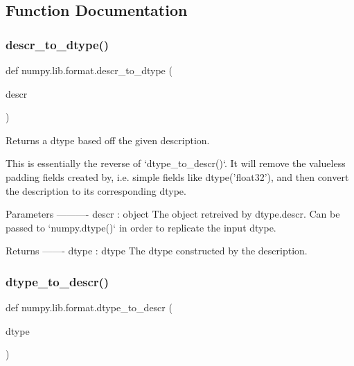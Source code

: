 \subsection{Function Documentation}
\mbox{\label{namespacenumpy_1_1lib_1_1format_a8ef944b60e69a059642419df5bc12fb0}} 
\subsubsection{\texorpdfstring{descr\+\_\+to\+\_\+dtype()}{descr\_to\_dtype()}}
{\footnotesize\ttfamily def numpy.\+lib.\+format.\+descr\+\_\+to\+\_\+dtype (\begin{DoxyParamCaption}\item[{}]{descr }\end{DoxyParamCaption})}

\begin{DoxyVerb}Returns a dtype based off the given description.

This is essentially the reverse of `dtype_to_descr()`. It will remove
the valueless padding fields created by, i.e. simple fields like
dtype('float32'), and then convert the description to its corresponding
dtype.

Parameters
----------
descr : object
    The object retreived by dtype.descr. Can be passed to
    `numpy.dtype()` in order to replicate the input dtype.

Returns
-------
dtype : dtype
    The dtype constructed by the description.\end{DoxyVerb}
 \mbox{\label{namespacenumpy_1_1lib_1_1format_ae62e215cf66dfa14897e2cbb3e399599}} 
\subsubsection{\texorpdfstring{dtype\+\_\+to\+\_\+descr()}{dtype\_to\_descr()}}
{\footnotesize\ttfamily def numpy.\+lib.\+format.\+dtype\+\_\+to\+\_\+descr (\begin{DoxyParamCaption}\item[{}]{dtype }\end{DoxyParamCaption})}

